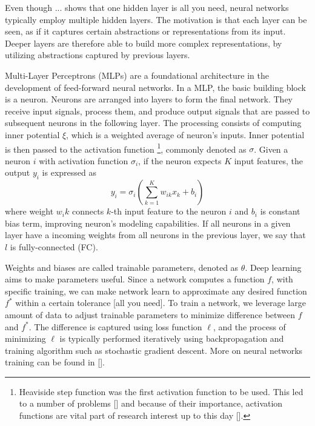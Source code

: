 Even though ... shows that one hidden layer is all you need, neural networks typically employ multiple hidden layers.
The motivation is that each layer can be seen, as if it captures certain abstractions or representations from its input.
Deeper layers are therefore able to build more complex representations, by utilizing abstractions captured by previous layers.

Multi-Layer Perceptrons (MLPs) are a foundational architecture in the development of feed-forward neural networks.
In a MLP, the basic building block is a neuron.
Neurons are arranged into layers to form the final network.
They receive input signals, process them, and produce output signals that are passed to subsequent neurons in the following layer.
The processing consists of computing inner potential $\xi$, which is a weighted average of neuron's inputs.
Inner potential is then passed to the activation function \footnote{Heaviside step function was the first activation function to be used. This led to a number of problems [] and because of their importance, activation functions are vital part of research interest up to this day [].}, commonly denoted as $\sigma$. 
Given a neuron $i$ with activation function $\sigma_i$, if the neuron expects $K$ input features, the output $y_i$ is expressed as
\begin{equation}
    y_i = \sigma_i(\sum_{k=1}^K w_{ik}x_k + b_i)
\end{equation}
where weight $w_ik$ connects $k$-th input feature to the neuron $i$ and $b_i$ is constant bias term, improving neuron's modeling capabilities.
If all neurons in a given layer have a incoming weights from all neurons in the previous layer, we say that $l$ is fully-connected (FC).

Weights and biases are called trainable parameters, denoted as $\theta$.
Deep learning aims to make parameters useful.
Since a network computes a function $f$, with specific training, we can make network learn to approximate any desired function $f^*$ within a certain tolerance [all you need].
To train a network, we leverage large amount of data to adjust trainable parameters to minimize difference between $f$ and $f^*$.
The difference is captured using loss function $\ell$, and the process of minimizing $\ell$ is typically performed iteratively using backpropagation and training algorithm such as stochastic gradient descent.
More on neural networks training can be found in [].

